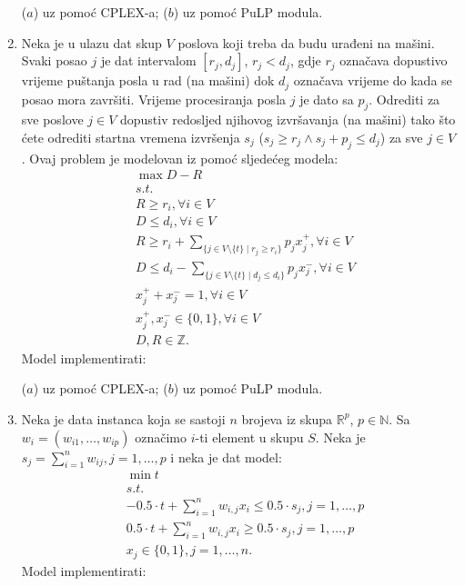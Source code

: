 \documentclass[a4paper, utf8, 11pt, colorlinks]{book}
\begin{document}
\begin{enumerate}
      ($a$) uz pomoć CPLEX-a; ($b$) uz pomoć PuLP modula. 
   \item   %
   Neka je u ulazu dat skup $V$ poslova koji treba da budu urađeni na mašini. Svaki posao $j$ je dat intervalom $[r_j, d_j]$, $r_j < d_j$, gdje $r_j$ označava dopustivo vrijeme puštanja posla u rad (na mašini) dok $d_j$ označava vrijeme do kada se posao mora završiti.  
   Vrijeme procesiranja posla $j$ je dato sa $p_j$. 
   Odrediti za sve poslove $j  \in V$ dopustiv redosljed njihovog izvršavanja (na mašini) tako što ćete odrediti startna vremena izvršenja $s_j$ ($s_j \geq r_j \wedge s_j + p_j \leq d_j$) za sve $j \in V$. Ovaj problem je modelovan iz pomoć sljedećeg modela:
   \begin{align*}
          &\max D - R \\
          & s.t. \\
          & R \geq r_i, \forall i \in V \\
          & D \leq d_i, \forall i \in V \\
          & R \geq r_i + \sum_{ \{ j \in V \setminus \{t\} \mid r_j \geq r_i \} } p_j x_j^+, \forall i \in V \\
          & D \leq d_i -  \sum_{ \{ j \in V \setminus \{t\} \mid d_j \leq d_i \}} p_j x_j^-, \forall i \in V \\
          & x_j^+ + x_j^-  = 1, \forall i \in V \\
          &   x_j^+, x_j^- \in \{0, 1\}, \forall i \in V \\
          & D, R \in \mathbb{Z}. 
   \end{align*} 
          Model implementirati:
    
    ($a$) uz pomoć CPLEX-a; ($b$) uz pomoć PuLP modula. 
    \item Neka je data instanca koja se sastoji  $n$ brojeva iz skupa $\mathbb{R}^p$, $p\in \mathbb{N}$. Sa $w_{i}=(w_{i1},\ldots, w_{ip})$ označimo $i$-ti element u skupu $S$. 
    Neka je $s_j = \sum_{i=1}^n w_{ij}, j=1,\ldots, p$ i neka je dat model:
    \begin{align*}
    	&\min t  \\
    	& s.t. \\
    	&-0.5 \cdot t + \sum_{i=1}^n w_{i,j}    x_i  \leq 0.5 \cdot s_j, j=1,\ldots,p \\
    	& 0.5 \cdot t + \sum_{i=1}^n w_{i,j} x_i  \geq 0.5 \cdot s_j, j=1,\ldots,p \\
    	& x_j \in \{0, 1\}, j = 1,\ldots,n.
    \end{align*}
             Model implementirati:
     

\end{enumerate}
\end{document}
